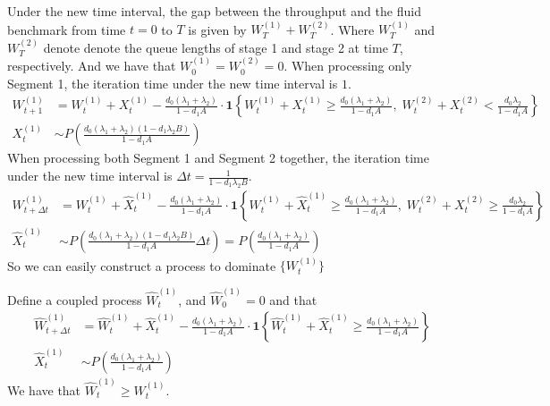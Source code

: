 \documentclass[opre, nonblindrev]{informs3} %
\begin{document}
Under the new time interval, the gap between the throughput and the fluid benchmark from time $t = 0$ to $T$ is given by $W_T^{(1)}+W_T^{(2)}$. Where $W_T^{(1)}$ and $W_T^{(2)}$ denote denote the queue lengths of stage 1 and stage 2 at time $T$, respectively. And we have that $W_0^{(1)}=W_0^{(2)}=0$. When processing only Segment 1, the iteration time under the new time interval is $1$.
\begin{align*}
W_{t+1}^{(1)}&=W_t^{(1)}+X_t^{(1)}-\frac{d_0 (\lambda_1+\lambda_2)}{1-d_1 A}\cdot \mathbf{1}\left\{ W_t^{(1)} + X_t^{(1)} \geq \frac{d_0 (\lambda_1+\lambda_2)}{1-d_1 A},\;W_t^{(2)} + X_t^{(2)} < \frac{d_0 \lambda_2}{1-d_1 A} \right\}\\ 
X_t^{(1)}&\sim P(\frac{d_0 \left(\lambda_1+\lambda_2\right)\left(1-d_1\lambda_2B\right)}{1 - d_1 A})
\end{align*}
When processing both Segment 1 and Segment 2 together, the iteration time under the new time interval is $\Delta t = \frac{1}{1-d_1\lambda_2B}$. 
\begin{align*}
W_{t+\Delta t}^{(1)}&=W_t^{(1)}+\hat{X}_t^{(1)}-\frac{d_0 (\lambda_1+\lambda_2)}{1-d_1 A}\cdot \mathbf{1}\left\{ W_t^{(1)} + \hat{X}_t^{(1)} \geq \frac{d_0 (\lambda_1+\lambda_2)}{1-d_1 A},\;W_t^{(2)} + X_t^{(2)} \geq  \frac{d_0 \lambda_2}{1-d_1 A} \right\}\\ 
\hat{X}_t^{(1)}&\sim P(\frac{d_0 \left(\lambda_1+\lambda_2\right)\left(1-d_1\lambda_2B\right)}{1 - d_1 A}\Delta t)=P(\frac{d_0 \left(\lambda_1+\lambda_2\right)}{1 - d_1 A})
\end{align*}
So we can easily construct a process to dominate $\{W_t^{(1)}\}$
\begin{lemma}\label{lemma::coupled process for unknown type}
    Define a coupled process $\hat{W}_t^{(1)}$, and $\hat{W}_0^{(1)}=0$ and that
    \begin{align*}
\hat{W}_{t+\Delta t}^{(1)}&=\hat{W}_t^{(1)}+\hat{X}_t^{(1)}-\frac{d_0 (\lambda_1+\lambda_2)}{1-d_1 A}\cdot \mathbf{1}\left\{ \hat{W}_t^{(1)} + \hat{X}_t^{(1)} \geq \frac{d_0 (\lambda_1+\lambda_2)}{1-d_1 A}\right\}\\ 
\hat{X}_t^{(1)}&\sim P(\frac{d_0 \left(\lambda_1+\lambda_2\right)}{1 - d_1 A})
    \end{align*}
We have that $\hat{W}_t^{(1)}\geq W_t^{(1)}$.
\end{lemma}
\end{document}
